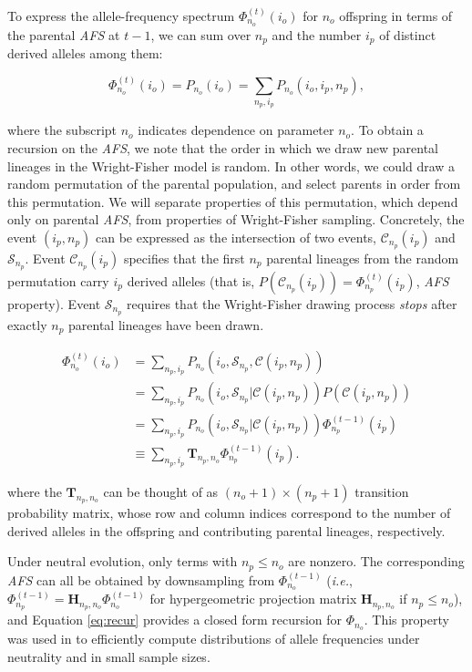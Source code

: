 \documentclass[review]{elsarticle}
\newcommand{\afs}[2]{\Phi_{#1}^{(#2)}}
\begin{document}
To express the allele-frequency spectrum $\afs{n_o}{t}(i_o)$ for $n_o$ offspring in terms of the parental
\textit{AFS} at $t-1$, we can sum over $n_p$ and the number $i_p$ of distinct derived alleles
among them:

\begin{equation}
  \afs{n_o}{t}(i_o)=P_{n_o} (i_o) =\sum_{n_p,i_p} P_{n_o}(i_o,i_p,n_p),
\end{equation}

where the subscript $n_o$ indicates dependence on parameter $n_o$. To obtain a recursion on the
\textit{AFS}, we note that the order in which we draw new parental lineages in the Wright-Fisher
model is random. In other words, we could draw a random permutation of the parental population, and
select parents in order from this permutation. We will separate properties of this permutation,
which depend only on parental \textit{AFS}, from properties of Wright-Fisher sampling. Concretely,
the event $(i_p,n_p)$ can be expressed as the intersection of two events, $\mathcal{C}_{n_p}(i_p)$
and $\mathcal{S}_{n_p}$. Event $\mathcal{C}_{n_p}(i_p)$ specifies that the first $n_p$ parental
lineages from the random permutation carry $i_p$ derived alleles (that is,
$P(\mathcal{C}_{n_p}(i_p)) =\afs{n_p}{t} (i_p)$, \textit{AFS} property). Event $\mathcal{S}_{n_p}$
requires that the Wright-Fisher drawing process \textit{stops} after exactly $n_p$ parental lineages
have been drawn.

\begin{equation}
  \begin{split}
    \afs{n_o}{t}(i_o)&= \sum_{n_p,i_p} P_{n_o}(i_o, \mathcal{S}_{n_p}, \mathcal{C}(i_p,n_p) )\\
    &=   \sum_{n_p,i_p} P_{n_o}(i_o, \mathcal{S}_{n_p}| \mathcal{C}(i_p,n_p) ) P(\mathcal{C}(i_p,n_p))\\
    &=   \sum_{n_p,i_p} P_{n_o}(i_o, \mathcal{S}_{n_p}| \mathcal{C}(i_p,n_p) )  \afs{n_p}{t-1}(i_p)\\
    &\equiv  \sum_{n_p,i_p}  \mathbf{T}_{n_p,n_o}     \afs{n_p}{t-1}(i_p).
  \end{split}
  \label{eq:recur}
\end{equation}

where the $\mathbf{T}_{n_p,n_o}$ can be thought of as $(n_o+1) \times (n_p+1)$ transition
probability matrix, whose row and column indices correspond to the number of derived alleles in the
offspring and contributing parental lineages, respectively.

Under neutral evolution, only terms with $n_p\leq n_o$ are nonzero. The corresponding \textit{AFS}
can all be obtained by downsampling from $\afs{n_o}{t-1}$ (\textit{i.e.}, $\afs{n_p}{t-1} =
\mathbf{H}_{n_p,n_o} \afs{n_o}{t-1}$ for hypergeometric projection matrix $\mathbf{H}_{n_p,n_o}$ if
$n_p\leq n_o$), and Equation \eqref{eq:recur} provides a closed form recursion for $\Phi_{n_o}$.
This property was used in \cite{JouganousEtAl2017} to efficiently compute distributions of allele
frequencies under neutrality and in small sample sizes.
\end{document}
